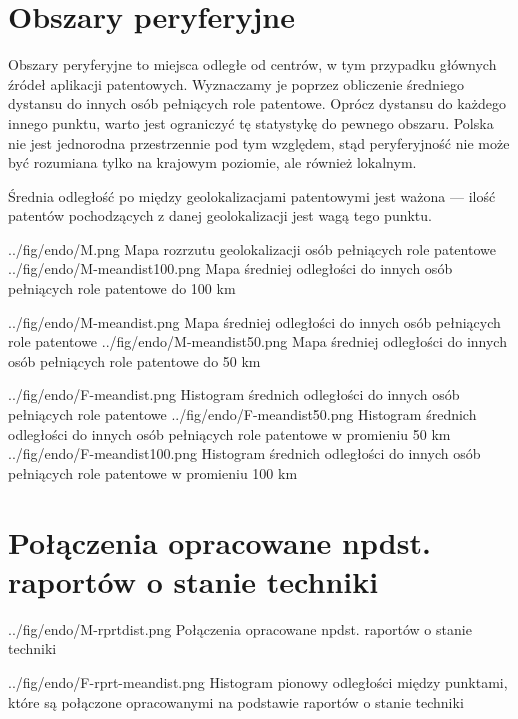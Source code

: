     \newpage\section
  {Obszary peryferyjne}

Obszary peryferyjne to miejsca odległe od centrów, w tym przypadku
głównych źródeł aplikacji patentowych. Wyznaczamy je poprzez obliczenie
średniego dystansu do innych osób pełniących role patentowe.
Oprócz dystansu do każdego innego punktu, warto jest ograniczyć
tę statystykę do pewnego obszaru. Polska nie jest jednorodna przestrzennie 
pod tym względem, stąd peryferyjność nie może być rozumiana tylko 
na krajowym poziomie, ale również lokalnym.

\begin{uwaga}
Średnia odległość po między geolokalizacjami patentowymi jest ważona ---
ilość patentów pochodzących z danej geolokalizacji jest wagą tego punktu.
\end{uwaga}

  \figsides
{../fig/endo/M.png}
{ Mapa rozrzutu geolokalizacji osób pełniących role patentowe }
{../fig/endo/M-meandist100.png}
{ Mapa średniej odległości do innych osób pełniących role patentowe do 100 km }

\figsides
{../fig/endo/M-meandist.png}
{ Mapa średniej odległości do innych osób pełniących role patentowe }
{../fig/endo/M-meandist50.png}
{ Mapa średniej odległości do innych osób pełniących role patentowe do 50 km }

\figsidesTri
{../fig/endo/F-meandist.png}
{ Histogram średnich odległości do innych osób pełniących role patentowe }
{../fig/endo/F-meandist50.png}
{ Histogram średnich odległości do innych osób pełniących role patentowe w promieniu 50 km }
{../fig/endo/F-meandist100.png}
{ Histogram średnich odległości do innych osób pełniących role patentowe w promieniu 100 km }




    \newpage\section
  {Połączenia opracowane npdst. raportów o stanie techniki}

{../fig/endo/M-rprtdist.png}
{ Połączenia opracowane npdst. raportów o stanie techniki }


  \newpage
  \figside
{../fig/endo/F-rprt-meandist.png}
{ Histogram pionowy odległości między punktami, które są 
  połączone opracowanymi na podstawie raportów o stanie techniki }




